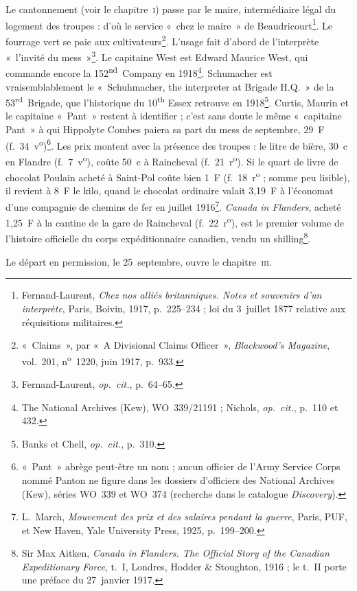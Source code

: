 Le cantonnement (voir le chapitre~\textsc{i}) passe par le maire, intermédiaire légal du logement des troupes : d'où le service «~chez le maire~» de Beaudricourt\footnote{Fernand-Laurent, \textit{Chez nos alliés britanniques. Notes et souvenirs d'un interprète}, Paris, Boivin, 1917, p.~225--234 ; loi du 3~juillet 1877 relative aux réquisitions militaires.}. Le fourrage vert se paie aux cultivateurs\footnote{«~Claims~», par «~A Divisional Claims Officer~», \textit{Blackwood's Magazine}, vol.~201, n\textsuperscript{o}~1220, juin 1917, p.~933.}. L'usage fait d'abord de l'interprète «~l'invité du mess~»\footnote{Fernand-Laurent, \textit{op.~cit.}, p.~64--65.}. Le capitaine West est Edward Maurice West, qui commande encore la 152\textsuperscript{nd}~Company en 1918\footnote{The National Archives (Kew), WO~339/21191 ; Nichols, \textit{op.~cit.}, p.~110 et 432.}. Schumacher est vraisemblablement le «~Schuhmacher, the interpreter at Brigade H.Q.~» de la 53\textsuperscript{rd}~Brigade, que l'historique du 10\textsuperscript{th} Essex retrouve en 1918\footnote{Banks et Chell, \textit{op.~cit.}, p.~310.}. Curtis, Maurin et le capitaine «~Pant~» restent à identifier ; c'est sans doute le même «~capitaine Pant~» à qui Hippolyte Combes paiera sa part du mess de septembre, 29~F (f.~34~v\textsuperscript{o})\footnote{«~Pant~» abrège peut-être un nom ; aucun officier de l'Army Service Corps nommé Panton ne figure dans les dossiers d'officiers des National Archives (Kew), séries WO~339 et WO~374 (recherche dans le catalogue \textit{Discovery}).}. Les prix montent avec la présence des troupes : le litre de bière, 30~c en Flandre (f.~7~v\textsuperscript{o}), coûte 50~c à Raincheval (f.~21~r\textsuperscript{o}). Si le quart de livre de chocolat Poulain acheté à Saint-Pol coûte bien 1~F (f.~18~r\textsuperscript{o} ; somme peu lisible), il revient à 8~F le kilo, quand le chocolat ordinaire valait 3,19~F à l'économat d'une compagnie de chemins de fer en juillet 1916\footnote{L.~March, \textit{Mouvement des prix et des salaires pendant la guerre}, Paris, PUF, et New Haven, Yale University Press, 1925, p.~199--200.}. \textit{Canada in Flanders}, acheté 1,25~F à la cantine de la gare de Raincheval (f.~22~r\textsuperscript{o}), est le premier volume de l'histoire officielle du corps expéditionnaire canadien, vendu un shilling\footnote{Sir Max Aitken, \textit{Canada in Flanders. The Official Story of the Canadian Expeditionary Force}, t.~I, Londres, Hodder \& Stoughton, 1916 ; le t.~II porte une préface du 27~janvier 1917.}.

Le départ en permission, le 25~septembre, ouvre le chapitre~\textsc{iii}.
